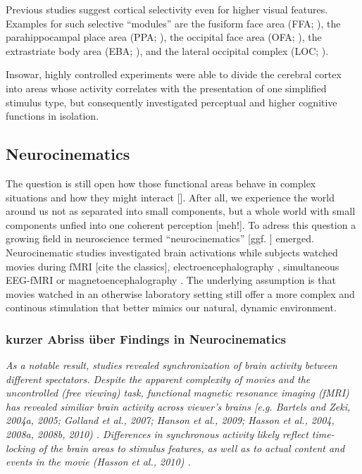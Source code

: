 \documentclass[10pt,a4paper,twocolumn]{article}
\begin{document}
Previous studies suggest cortical selectivity even for higher visual
features. Examples for such selective ``modules'' are the fusiform
face area (FFA; \citealp{kanwisher_1997_fusiform_face_area}), the
parahippocampal place area (PPA; \citealp{epstein_1999_parahippocampal_place_area}),
the occipital face area (OFA; \citealp{pitcher_2011_occipital_face_area}),
the extrastriate body area (EBA; \citealp{downing_2001_extrastriate_body_area}),
and the lateral occipital complex (LOC; \citealp{malach_1995_lateral_occipital_complex}).

Insowar, highly controlled experiments were able to divide the cerebral
cortex into areas whose activity correlates with the presentation
of one simplified stimulus type, but consequently investigated perceptual
and higher cognitive functions in isolation. 


\subsection{Neurocinematics}

The question is still open how those functional areas behave in complex
situations and how they might interact {[}\citet{bartels_2004_mapping_during_free_viewing}{]}.
After all, we experience the world around us not as separated into
small components, but a whole world with small components unfied into
one coherent perception {[}meh!{]}. To adress this question a growing
field in neuroscience termed ``neurocinematics'' \citep{hasson_2008_neurocinematics}
{[}ggf. \citealp{hasson_2012_future_trends_neuroimaging}{]} emerged.
Neurocinematic studies investigated brain activations while subjects
watched movies during fMRI {[}cite the classics{]}, electroencephalography
\citep{dmochowski_2014_walking_dead_tweets,krause_2000_eeg_to_emotional_film},
simultaneous EEG-fMRI \citep{whittingstall_2010_movies_eeg_fmri}
or magnetoencephalography \citep{huttunen_2013_mind_reading_logistic_regression,lankinen_2014_MEG_during_movie,luo_2010_auditory_cortex_tracks}.
The underlying assumption is that movies watched in an otherwise laboratory
setting still offer a more complex and continous stimulation that
better mimics our natural, dynamic environment.


\subsubsection{kurzer Abriss über Findings in Neurocinematics}

\emph{As a notable result, studies revealed synchronization of brain
	activity between different spectators. Despite the apparent complexity
	of movies and the uncontrolled (free viewing) task, functional magnetic
	resonance imaging (fMRI) has revealed similiar brain activity across
	viewer's brains {[}e.g. Bartels and Zeki, 2004a, 2005; Golland et
	al., 2007; Hanson et al., 2009; Hasson et al., 2004, 2008a, 2008b,
	2010) \citep{hasson_2004_synchronization_natural_vision,hasson_2006_human_brain_during_dynamic_scenes,hasson_2008_hierarchy_temporal_windows}.
	Differences in synchronous activity likely reflect time-locking of
	the brain areas to stimulus features, as well as to actual content
	and events in the movie (Hasson et al., 2010) \citep{lankinen_2014_MEG_during_movie}. }
\end{document}
